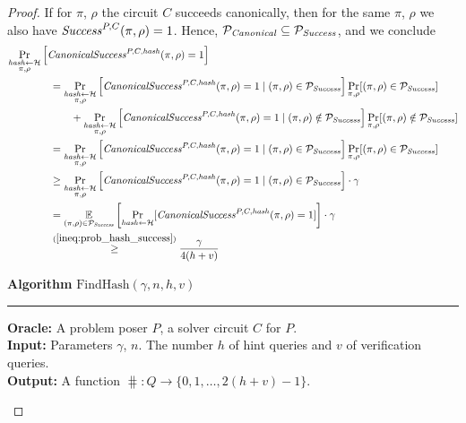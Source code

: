 \begin{proof}
If for $\pi$, $\rho$ the circuit $C$ succeeds canonically, then for the same $\pi$, $\rho$ we also have $\operatorname{\mathit{Success}}^{P, C}(\pi, \rho) = 1$.
Hence, $\mathcal{P}_{\mathit{Canonical}} \subseteq \mathcal{P}_{\mathit{Success}}$, and we conclude
\begin{align}
  \label{ineq:hash_high_prob}
&\underset{\substack{\hash \leftarrow \cH \\ \pi, \rho}}{\Pr}\left[\CanonicalSuccess^{P, C, \hash}(\pi, \rho) = 1\right] \notag\\
&\IndII = \underset{\substack{\hash \leftarrow \cH \\ \pi, \rho}}{\Pr}\left[\CanonicalSuccess^{P,C,\hash}(\pi, \rho) = 1 \mid (\pi, \rho) \in \cP_{\mathit{Success}}\right]
\underset{\pi, \rho}{\Pr}[(\pi, \rho) \in \cP_{\mathit{Success}}] \notag\\
&\IndIII + \underset{\substack{\hash \leftarrow \cH \\ \pi, \rho}}{\Pr}\left[\CanonicalSuccess^{P,C,\hash}(\pi, \rho) = 1 \mid (\pi, \rho) \notin \cP_{\mathit{Success}} \right]
\underset{\pi, \rho}{\Pr}[(\pi, \rho) \notin \cP_{\mathit{Success}}] \notag\\
%
&\IndII = \underset{\substack{\hash \leftarrow \cH \\ \pi, \rho}}{\Pr}\left[\CanonicalSuccess^{P,C,\hash}(\pi, \rho) = 1 \mid (\pi, \rho) \in \cP_{\mathit{Success}}\right]
\underset{\pi, \rho}{\Pr}[(\pi, \rho) \in \cP_{\mathit{Success}}] \notag\\
%
&\IndII \geq
\underset{\substack{\hash \leftarrow \cH \\ \pi, \rho}}{\Pr}\left[\CanonicalSuccess^{P,C,\hash}(\pi, \rho) = 1 \mid (\pi, \rho) \in \cP_{\mathit{Success}}\right] \cdot \gamma \notag\\
&\IndII =
\underset{(\pi, \rho) \in \cP_{\mathit{Success}}}
{\mathbb{E}}\left[\underset{\hash \leftarrow \cH}{\Pr}[\CanonicalSuccess^{P,C,\hash}(\pi, \rho) = 1] \right] \cdot \gamma \notag\\
&\IndII \stackrel{(\ref{ineq:prob_hash_success})}{\geq} \frac{\gamma}{4(h+v)}
\end{align}
%
\begin{codeblock}
  \textbf{Algorithm} $\text{FindHash}(\gamma, n, h, v)$
  \medskip
  \hrule
  \medskip
  \textbf{Oracle:} A problem poser $P$, a solver circuit $C$ for $P$.\\
  \textbf{Input:} Parameters $\gamma$, $n$. The number $h$ of hint queries and $v$ of verification queries. \\
  \textbf{Output:} A function $\hash:Q \rightarrow \{0,1, \dots, 2(h+v)-1 \}$.

\end{codeblock}
\end{proof}
